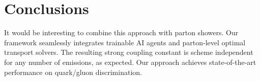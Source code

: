 \section{Conclusions}\label{sec:conclusions}

It would be interesting to combine this approach with parton showers.
Our framework seamlessly integrates trainable AI agents and parton-level
optimal transport solvers. The resulting strong coupling constant is
scheme independent for any number of emissions, as expected. Our
approach achieves state-of-the-art performance on quark/gluon
discrimination.

